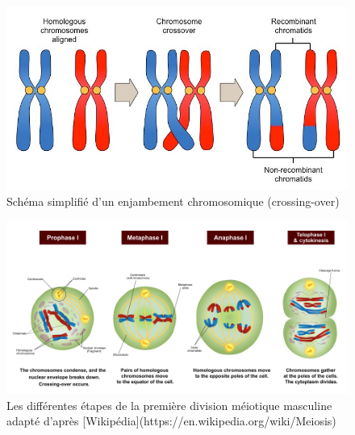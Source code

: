 \documentclass[12pt,twoside]{reedthesis}
\theoremstyle{definition}
\theoremstyle{definition}
\theoremstyle{remark}
\begin{document}
  \begin{figure}
  
  {\centering \includegraphics[scale=0.35]{figure/crossingover} 
  
  }
  
  \caption{Schéma simplifié d'un enjambement chromosomique (crossing-over)}\label{fig:crossingover}
  \end{figure}
  
  \newpage 
  
  \begin{figure}
  
  {\centering \includegraphics[scale=0.43]{figure/MeiosisI} 
  
  }
  
  \caption[Les différentes étapes de la première division méiotique masculine adapté]{Les différentes étapes de la première division méiotique masculine adapté d'après [Wikipédia](https://en.wikipedia.org/wiki/Meiosis)}\label{fig:meiosei}
  \end{figure}
  
\end{document}

